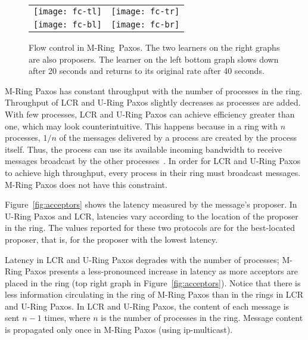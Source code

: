 \documentclass[final,3p,times,twocolumn,authoryear]{elsarticle}
\begin{document}
\begin{figure*}
          \vspace{-15mm}
  \begin{center}
  
    \begin{tabular}{cc}
      \texttt{[image: fc-tl]} &
       \texttt{[image: fc-tr]} \\
      \texttt{[image: fc-bl]} &
      \texttt{[image: fc-br]} \\

    \end{tabular}
\caption{Flow control in M-Ring~Paxos. The two learners on the right graphs are also proposers. The learner on the left bottom graph slows down after 20 seconds and returns to its original rate after 40 seconds. }
    \label{fig:fcontrol}
        \vspace{-5mm}
  \end{center}
\end{figure*}



M-Ring Paxos has constant throughput with the number of processes in the ring. Throughput of LCR and U-Ring Paxos slightly decreases as processes are added. With few processes, LCR and U-Ring Paxos can achieve efficiency greater than one, which may look counterintuitive. This happens because in a ring with $n$ processes, $1/n$ of the messages delivered by a process are created by the process itself. Thus, the process can use its available incoming bandwidth to receive messages broadcast by the other processes~\cite{Guerraoui2010}.
In order for LCR and U-Ring Paxos to achieve high throughput, every process in their ring must broadcast messages. 
M-Ring Paxos does not have this constraint.

Figure~\ref{fig:acceptors} shows the latency measured by the message's proposer. 
In U-Ring Paxos and LCR, latencies vary according to the location of the proposer in the ring. 
The values reported for these two protocols are for the best-located proposer, that is, for the proposer with the lowest latency. 

Latency in LCR and U-Ring Paxos degrades with the number of processes; M-Ring Paxos presents a less-pronounced increase in latency as more acceptors are placed in the ring (top right graph in Figure~\ref{fig:acceptors}). Notice that there is less information circulating in the ring of M-Ring Paxos than in the rings in LCR and U-Ring Paxos. In LCR and U-Ring Paxos, the content of each message is sent $n-1$ times, where $n$ is the number of processes in the ring. Message content is propagated only once in M-Ring Paxos (using ip-multicast). 
\end{document}
